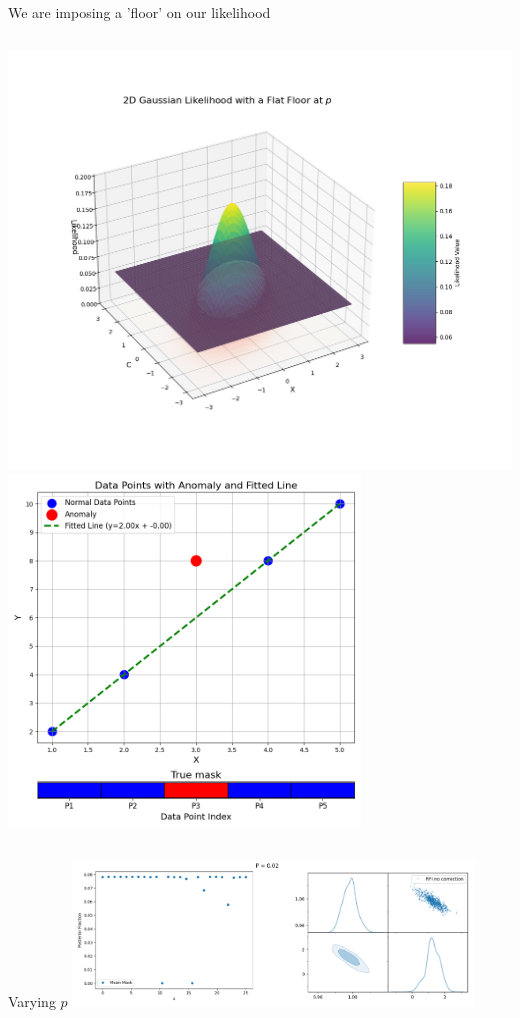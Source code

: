 \documentclass[aspectratio=169]{beamer}
\begin{document}
\begin{frame}{We are imposing a 'floor' on our likelihood}
    \begin{columns}
            \centering
            \includegraphics[width=1.2\textwidth]{images/likelihood_floor_plot.png}
            \centering
            \includegraphics[width=0.7\textwidth]{images/generated_plot.png}
    \end{columns}
\end{frame}

\begin{frame}{Varying $p$}
    \centering
    \includegraphics[width=0.8\textwidth]{images/gif_anest/comb_2.png}
\end{frame}
\end{document}
